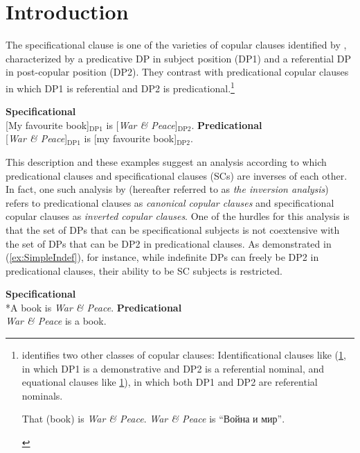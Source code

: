\documentclass[
	letterpaper,
]{article}
\begin{document}
\section{Introduction}
The specificational clause is one of the varieties of copular clauses identified by \textcite{higgins1973pseudo}, characterized by a predicative DP in subject position (DP1) and a referential DP in post-copular position (DP2).
They contrast with predicational copular clauses in which DP1 is referential and DP2 is predicational.\footnote{
	\textcite{higgins1973pseudo} identifies two other classes of copular clauses:
	Identificational clauses like (\ref{ex:IDCl}, in which DP1 is a demonstrative and DP2 is a referential nominal, and equational clauses like \ref{ex:EqCl}), in which both DP1 and DP2 are referential nominals.
	\begin{xlisti}
		\ex\label{ex:IDCl} That (book) is \textit{War \& Peace}.
		\ex\label{ex:EqCl} \textit{War \& Peace} is \foreignlanguage{russian}{``Война и мир''}.	
	\end{xlisti}

}
\begin{exe}
	\ex
	\begin{xlist}	
		\ex\label{ex:SC} \textbf{Specificational}\\
		{[My favourite book]$_{\text{DP1}}$} is {[\textit{War \& Peace}]$_{\text{DP2}}$}.
		\ex\label{ex:PC} \textbf{Predicational}\\
		{[\textit{War \& Peace}]$_{\text{DP1}}$} is {[my favourite book]$_{\text{DP2}}$}.
	\end{xlist}
\end{exe}
This description and these examples suggest an analysis according to which predicational clauses and specificational clauses (SCs) are inverses of each other.
In fact, one such analysis by \textcite{moro1997raising} (hereafter referred to as \textit{the inversion analysis}) refers to predicational clauses as \textit{canonical copular clauses} and specificational copular clauses as \textit{inverted copular clauses}.
One of the hurdles for this analysis is that the set of DPs that can be specificational subjects is not coextensive with the set of DPs that can be DP2 in predicational clauses.
As demonstrated in (\ref{ex:SimpleIndef}), for instance, while indefinite DPs can freely be DP2 in predicational clauses, their ability to be SC subjects is restricted. 
\begin{exe}
	\ex\label{ex:SimpleIndef}
	\begin{xlist}
		\ex  \textbf{Specificational}\\
		*A book is \textit{War \& Peace}.
		\ex \textbf{Predicational}\\
		\textit{War \& Peace} is a book.	
	\end{xlist}
\end{exe}
\end{document}
